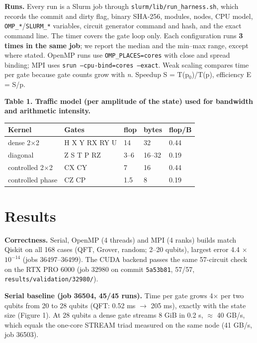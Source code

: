 \documentclass[10pt,a4paper]{article}
\begin{document}
\textbf{Runs.} Every run is a Slurm job through \texttt{slurm/lib/run\_harness.sh}, which records the commit and dirty flag, binary SHA-256, modules, nodes, CPU model, \texttt{OMP\_*}/\texttt{SLURM\_*} variables, circuit generator command and hash, and the exact command line. The timer covers the gate loop only. Each configuration runs \textbf{3 times in the same job}; we report the median and the min--max range, except where stated. OpenMP runs use \texttt{OMP\_PLACES=cores} with close and spread binding; MPI uses \texttt{srun --cpu-bind=cores --exact}. Weak scaling compares time per gate because gate counts grow with \emph{n}. Speedup S = T(p$_0$)/T(p), efficiency E = S/p.



\textbf{Table 1. Traffic model (per amplitude of the state) used for bandwidth and arithmetic intensity.}



\begin{table}[ht]\centering\small
\begin{tabularx}{\linewidth}{@{}XlllX@{}}
\toprule
\textbf{Kernel} & \textbf{Gates} & \textbf{flop} & \textbf{bytes} & \textbf{flop/B} \\
\midrule
dense 2$\times$2 & H X Y RX RY U & 14 & 32 & 0.44 \\
diagonal & Z S T P RZ & 3--6 & 16--32 & 0.19 \\
controlled 2$\times$2 & CX CY & 7 & 16 & 0.44 \\
controlled phase & CZ CP & 1.5 & 8 & 0.19 \\
\bottomrule
\end{tabularx}
\end{table}



\section{Results}



\textbf{Correctness.} Serial, OpenMP (4 threads) and MPI (4 ranks) builds match Qiskit on all 168 cases (QFT, Grover, random; 2--20 qubits), largest error 4.4 $\times$ $10^{-14}$ (jobs 36497--36499). The CUDA backend passes the same 57-circuit check on the RTX PRO 6000 (job 32980 on commit \texttt{5a53b81}, 57/57, \texttt{results/validation/32980/}).



\textbf{Serial baseline (job 36504, 45/45 runs).} Time per gate grows 4$\times$ per two qubits from 20 to 28 qubits (QFT: 0.52 ms $\rightarrow$ 205 ms), exactly with the state size (Figure 1). At 28 qubits a dense gate streams 8 GiB in 0.2 s, $\approx$ 40 GB/s, which equals the one-core STREAM triad measured on the same node (41 GB/s, job 36503).
\end{document}
